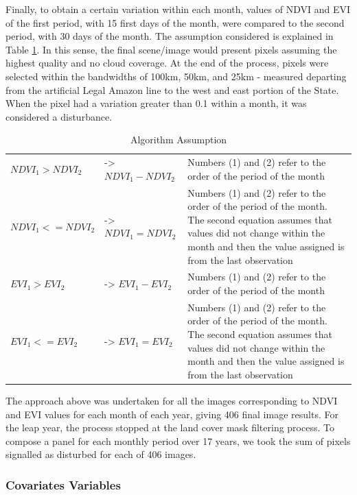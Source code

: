 Finally, to obtain a certain variation within each month, values of NDVI and EVI of the first period, with 15 first days of the month, were compared to the second period, with 30 days of the month. The assumption considered is explained in Table \ref{assumption}. In this sense, the final scene/image would present pixels assuming the highest quality and no cloud coverage. At the end of the process, pixels were selected within the bandwidths of 100km, 50km, and 25km - measured departing from the artificial Legal Amazon line to the west and east portion of the State. When the pixel had a variation greater than 0.1 within a month, it was considered a disturbance.

\begin{table}[H]
\footnotesize
\caption{Algorithm Assumption}
\begin{tabularx}{\linewidth}{X X X}
\hline
\hline
$NDVI_{1} > NDVI_{2}$	& ->  $NDVI_{1} - NDVI_{2}$	 & Numbers (1) and (2) refer to the order of the period of the month \\
$NDVI_{1} <= NDVI_{2}$	& ->  $NDVI_{1} = NDVI_{2}$	 & Numbers (1) and (2) refer to the order of the period of the month. The second equation assumes that values did not change within the month and then the value assigned is from the last observation	\\
\hline
$EVI_{1} > EVI_{2}$	& ->  $EVI_{1} - EVI_{2}$	 & Numbers (1) and (2) refer to the order of the period of the month \\
$EVI_{1} <= EVI_{2}$	& ->  $EVI_{1} = EVI_{2}$	 & Numbers (1) and (2) refer to the order of the period of the month. The second equation assumes that values did not change within the month and then the value assigned is from the last observation 	\\
\hline
\hline
\end{tabularx}
\label{assumption}
\end{table}


The approach above was undertaken for all the images corresponding to NDVI and EVI values for each month of each year, giving 406 final image results. For the leap year, the process stopped at the land cover mask filtering process. To compose a panel for each monthly period over 17 years, we took the sum of pixels signalled as disturbed for each of 406 images. 

\subsubsection{Covariates Variables} \label{covariate variables}  %

